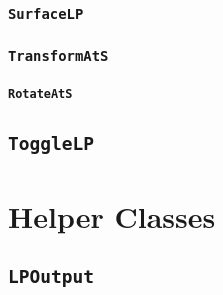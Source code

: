\subsubsection{\texttt{SurfaceLP}}

\subsubsection{\texttt{TransformAtS}}

\paragraph{\texttt{RotateAtS}}

\subsection{\texttt{ToggleLP}}

\section{Helper Classes}

\subsection{\texttt{LPOutput}}

